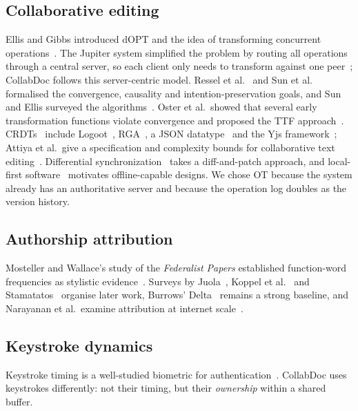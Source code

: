 \documentclass[conference]{IEEEtran}
\begin{document}
\subsection{Collaborative editing}
Ellis and Gibbs introduced dOPT and the idea of transforming concurrent operations~\cite{ellis1989}. The Jupiter system simplified the problem by routing all operations through a central server, so each client only needs to transform against one peer~\cite{nichols1995}; CollabDoc follows this server-centric model. Ressel et al.~\cite{ressel1996} and Sun et al.~\cite{sun1998} formalised the convergence, causality and intention-preservation goals, and Sun and Ellis surveyed the algorithms~\cite{sun1998ot}. Oster et al.\ showed that several early transformation functions violate convergence and proposed the TTF approach~\cite{oster2006}. CRDTs~\cite{shapiro2011} include Logoot~\cite{weiss2009}, RGA~\cite{roh2011}, a JSON datatype~\cite{kleppmann2017} and the Yjs framework~\cite{nicolaescu2016}; Attiya et al.\ give a specification and complexity bounds for collaborative text editing~\cite{attiya2016}. Differential synchronization~\cite{fraser2009} takes a diff-and-patch approach, and local-first software~\cite{kleppmann2019} motivates offline-capable designs. We chose OT because the system already has an authoritative server and because the operation log doubles as the version history.

\subsection{Authorship attribution}
Mosteller and Wallace's study of the \emph{Federalist Papers} established function-word frequencies as stylistic evidence~\cite{mosteller1963}. Surveys by Juola~\cite{juola2006}, Koppel et al.~\cite{koppel2009} and Stamatatos~\cite{stamatatos2009} organise later work, Burrows' Delta~\cite{burrows2002,evert2017} remains a strong baseline, and Narayanan et al.\ examine attribution at internet scale~\cite{narayanan2012}.

\subsection{Keystroke dynamics}
Keystroke timing is a well-studied biometric for authentication~\cite{monrose2000,killourhy2009,banerjee2012}. CollabDoc uses keystrokes differently: not their timing, but their \emph{ownership} within a shared buffer.

\end{document}

